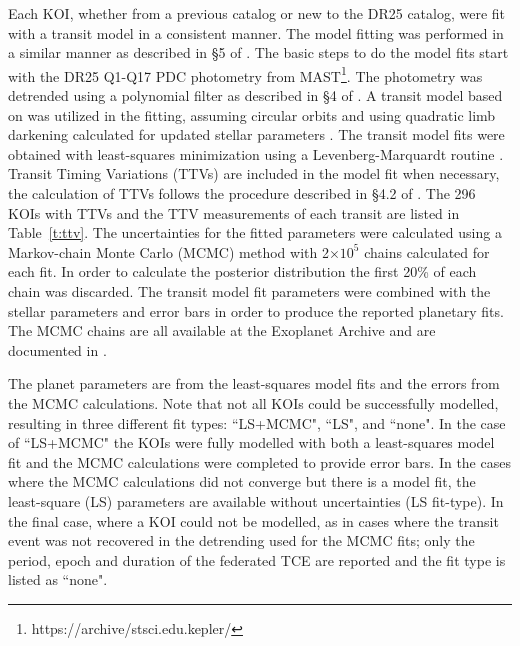 \label{s:mcmc}

Each KOI, whether from a previous catalog or new to the DR25 catalog, were fit with a transit model in a consistent manner. The model fitting was performed in a similar manner as described in \S5 of \citet{Rowe2015cat}. The basic steps to do the model fits start with the DR25 Q1-Q17 PDC photometry from MAST\footnote{https://archive/stsci.edu.kepler/}. The photometry was detrended using a polynomial filter as described in \S4 of \citet{Rowe2014}. A transit model based on \citet{Mandel2002} was utilized in the fitting, assuming circular orbits and using quadratic limb darkening \citep{Claret2011} calculated for updated stellar parameters \citep{Mathur2017ApJS}. The transit model fits were obtained with least-squares minimization using a Levenberg-Marquardt routine \citep{More1980}. Transit Timing Variations (TTVs) are included in the model fit when necessary, the
calculation of TTVs follows the procedure described in \S4.2 of \citet{Rowe2014}. The 296
KOIs with TTVs and the TTV measurements of each transit are listed in Table~\ref{t:ttv}.
The uncertainties for the fitted parameters were calculated using a Markov-chain Monte Carlo (MCMC) method \citep{Ford2005AJ} with 2$\times 10^{5}$ chains calculated for each fit. In order to calculate the posterior distribution the first 20\% of each chain was discarded. The transit model fit parameters were combined with the stellar parameters and error bars \citep{Mathur2017ApJS} in order to produce the reported planetary fits. The MCMC chains are all available at the Exoplanet Archive and are documented in \citet{Hoffman2017}. 

The planet parameters are from the least-squares model fits and the errors from the MCMC calculations. Note that not all KOIs could be successfully modelled, resulting in three different fit types: ``LS+MCMC", ``LS", and ``none". In the case of ``LS+MCMC" the KOIs were fully modelled with both a least-squares model fit and the MCMC calculations were completed to provide error bars. In the cases where the MCMC calculations did not converge but there is a model fit, the least-square (LS) parameters are available without uncertainties (LS fit-type). In the final case, where a KOI could not be modelled, as in cases where the transit event was not recovered in the detrending used for the MCMC fits; only the period, epoch and duration of the federated TCE are reported and the fit type is listed as ``none".

